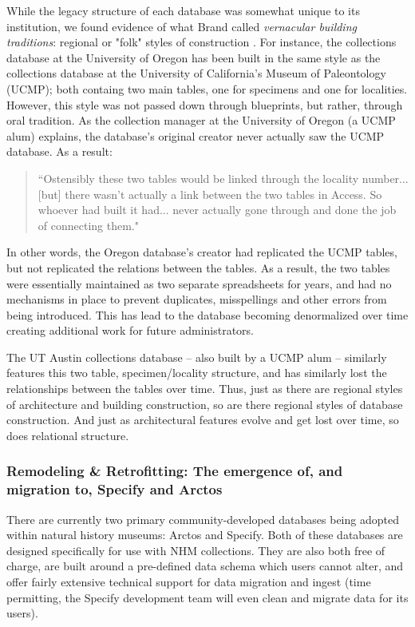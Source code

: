 While the legacy structure of each database was somewhat unique to its institution, we found evidence of what Brand called \textit{vernacular building traditions}: regional or "folk" styles of construction \cite{brand1995buildings}. For instance, the collections database at the University of Oregon has been built in the same style as the collections database at the University of California’s Museum of Paleontology (UCMP); both containg two main tables, one for specimens and one for localities. However, this style was not passed down through blueprints, but rather, through oral tradition. As the collection manager at the University of Oregon (a UCMP alum) explains, the database’s original creator never actually saw the UCMP database. As a result:
\begin{quote}
“Ostensibly these two tables would be linked through the locality number... [but] there wasn't actually a link between the two tables in Access. So whoever had built it had... never actually gone through and done the job of connecting them."
\end{quote}
In other words, the Oregon database's creator had replicated the UCMP tables, but not replicated the relations between the tables. As a result, the two tables were essentially maintained as two separate spreadsheets for years, and had no mechanisms in place to prevent duplicates, misspellings and other errors from being introduced. This has lead to the database becoming denormalized over time creating additional work for future administrators.  

The UT Austin collections database – also built by a UCMP alum – similarly features this two table, specimen/locality structure, and has similarly lost the relationships between the tables over time. Thus, just as there are regional styles of architecture and building construction, so are there regional styles of database construction. And just as architectural features evolve and get lost over time, so does relational structure.

\subsubsection{Remodeling \& Retrofitting: The emergence of, and migration to, Specify and Arctos}
There are currently two primary community-developed databases being adopted within natural history museums: Arctos and Specify. Both of these databases are designed specifically for use with NHM collections. They are also both free of charge, are built around a pre-defined data schema which users cannot alter, and offer fairly extensive technical support for data migration and ingest (time permitting, the Specify development team will even clean and migrate data for its users). 

